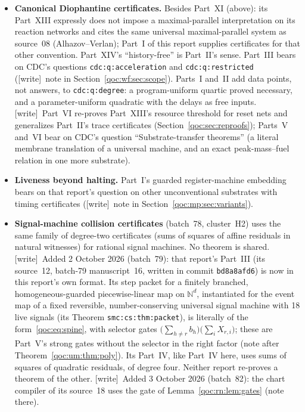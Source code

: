 \documentclass[11pt,letterpaper]{article}
\theoremstyle{definition}
\theoremstyle{remark}
\newcommand{\N}{\mathbb N}
\newcommand{\wtag}{\textup{[write]}}
\newcommand{\lab}[1]{\nolinkurl{#1}}
\begin{document}
\begin{itemize}
\item \textbf{Canonical Diophantine certificates.} Besides Part~XI (above): its Part~XIII expressly does not impose a maximal-parallel interpretation on its reaction networks and cites the same universal maximal-parallel system as source~08 (Alhazov--Verlan); Part~I of this report supplies certificates for that other convention. Part~XIV's ``history-free'' is Part~II's sense. Part~III bears on CDC's questions \lab{cdc:q:acceleration} and \lab{cdc:q:restricted} (\wtag\ note in Section~\ref{qoc:wf:sec:scope}). Parts~I and~II add data points, not answers, to \lab{cdc:q:degree}: a program-uniform quartic proved necessary, and a parameter-uniform quadratic with the delays as free inputs. \wtag\ Part~VI re-proves Part~XIII's resource threshold for reset nets and generalizes Part~II's trace certificates (Section~\ref{qoc:sec:reproofs}); Parts~V and~VI bear on CDC's question ``Substrate-transfer theorems'' (a literal membrane translation of a universal machine, and an exact peak-mass--fuel relation in one more substrate).
\item \textbf{Liveness beyond halting.} Part~I's guarded register-machine embedding bears on that report's question on other unconventional substrates with timing certificates (\wtag\ note in Section~\ref{qoc:mp:sec:variants}).
\item \textbf{Signal-machine collision certificates} (batch~78, cluster~H2) uses the same family of degree-two certificates (sums of squares of affine residuals in natural witnesses) for rational signal machines. No theorem is shared. \wtag\ Added 2 October 2026 (batch~79): that report's Part~III (its source~12, batch-79 manuscript~16, written in commit \texttt{bd8a8afd6}) is now in this report's own format. Its step packet for a finitely branched, homogeneous-guarded piecewise-linear map on $\N^d$, instantiated for the event map of a fixed reversible, number-conserving universal signal machine with 18 live signals (its Theorem \lab{smc:cs:thm:packet}), is literally of the form~\eqref{qoc:eq:spine}, with selector gates $\bigl(\sum_{h\ne r}b_h\bigr)\bigl(\sum_iX_{r,i}\bigr)$; these are Part~V's strong gates without the selector in the right factor (note after Theorem~\ref{qoc:um:thm:poly}). Its Part~IV, like Part~IV here, uses sums of squares of quadratic residuals, of degree four. Neither report re-proves a theorem of the other. \wtag\ Added 3 October 2026 (batch~82): the chart compiler of its source~18 uses the gate of Lemma~\ref{qoc:rn:lem:gates} (note there).

\end{itemize}
\end{document}
